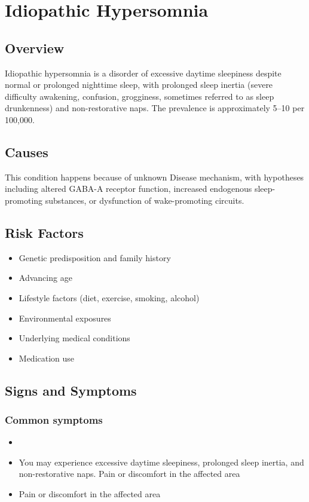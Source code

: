 \chapter{Idiopathic Hypersomnia}
\label{sec:Idiopathic Hypersomnia}

\section{Overview}
Idiopathic hypersomnia is a disorder of excessive daytime sleepiness despite normal or prolonged nighttime sleep, with prolonged sleep inertia (severe difficulty awakening, confusion, grogginess, sometimes referred to as sleep drunkenness) and non-restorative naps. The prevalence is approximately 5--10 per 100,000.
\section{Causes}
This condition happens because of unknown Disease mechanism, with hypotheses including altered GABA-A receptor function, increased endogenous sleep-promoting substances, or dysfunction of wake-promoting circuits.     
\section{Risk Factors}

\begin{itemize}[noitemsep]
  \item Genetic predisposition and family history
  \item Advancing age
  \item Lifestyle factors (diet, exercise, smoking, alcohol)
  \item Environmental exposures
  \item Underlying medical conditions
  \item Medication use
\end{itemize}
\section{Signs and Symptoms}

\subsection{Common symptoms}
\begin{itemize}[noitemsep]
  \item \item You may experience excessive daytime sleepiness, prolonged sleep inertia, and non-restorative naps. Pain or discomfort in the affected area    \item Pain or discomfort in the affected area
  \end{itemize}

